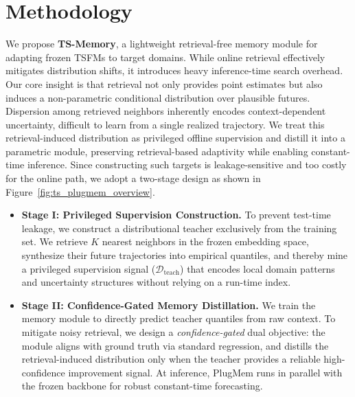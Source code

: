 \section{Methodology}
\label{sec:method}


We propose \textbf{TS-Memory}, a lightweight retrieval-free memory module for adapting frozen TSFMs to target domains. While online retrieval effectively mitigates distribution shifts, it introduces heavy inference-time search overhead. Our core insight is that retrieval not only provides point estimates but also induces a non-parametric conditional distribution over plausible futures. Dispersion among retrieved neighbors inherently encodes context-dependent uncertainty, difficult to learn from a single realized trajectory. We treat this retrieval-induced distribution as privileged offline supervision and distill it into a parametric module, preserving retrieval-based adaptivity while enabling constant-time inference. Since constructing such targets is leakage-sensitive and too costly for the online path, we adopt a two-stage design as shown in Figure~\ref{fig:ts_plugmem_overview}.


\begin{itemize}[leftmargin=*]
    \item \textbf{Stage I: Privileged Supervision Construction.} To prevent test-time leakage, we construct a distributional teacher exclusively from the training set. We retrieve $K$ nearest neighbors in the frozen embedding space, synthesize their future trajectories into empirical quantiles, and thereby mine a privileged supervision signal ($\mathcal{D}_{\text{teach}}$) that encodes local domain patterns and uncertainty structures without relying on a run-time index.
    
    \item \textbf{Stage II: Confidence-Gated Memory Distillation.} We train the memory module to directly predict teacher quantiles from raw context. To mitigate noisy retrieval, we design a \textit{confidence-gated} dual objective: the module aligns with ground truth via standard regression, and distills the retrieval-induced distribution only when the teacher provides a reliable high-confidence improvement signal. At inference, PlugMem runs in parallel with the frozen backbone for robust constant-time forecasting.
\end{itemize}

